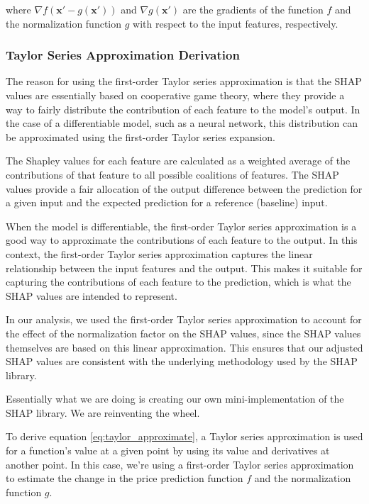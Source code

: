 \documentclass{article}
\begin{document}
where $\nabla f(\mathbf{x'} - g(\mathbf{x'}))$ and $\nabla g(\mathbf{x'})$ are the gradients of the function $f$ and the normalization function $g$ with respect to the input features, respectively.

\subsubsection{Taylor Series Approximation Derivation}

The reason for using the first-order Taylor series approximation is that the SHAP values are essentially based on cooperative game theory, where they provide a way to fairly distribute the contribution of each feature to the model's output. In the case of a differentiable model, such as a neural network, this distribution can be approximated using the first-order Taylor series expansion.

The Shapley values for each feature are calculated as a weighted average of the contributions of that feature to all possible coalitions of features. The SHAP values provide a fair allocation of the output difference between the prediction for a given input and the expected prediction for a reference (baseline) input.

When the model is differentiable, the first-order Taylor series approximation is a good way to approximate the contributions of each feature to the output. In this context, the first-order Taylor series approximation captures the linear relationship between the input features and the output. This makes it suitable for capturing the contributions of each feature to the prediction, which is what the SHAP values are intended to represent.

In our analysis, we used the first-order Taylor series approximation to account for the effect of the normalization factor on the SHAP values, since the SHAP values themselves are based on this linear approximation. This ensures that our adjusted SHAP values are consistent with the underlying methodology used by the SHAP library.

Essentially what we are doing is creating our own mini-implementation of the SHAP library. We are reinventing the wheel.

To derive equation \ref{eq:taylor_approximate}, a Taylor series approximation is used for a function's value at a given point by using its value and derivatives at another point. In this case, we're using a first-order Taylor series approximation to estimate the change in the price prediction function $f$ and the normalization function $g$.
\end{document}
